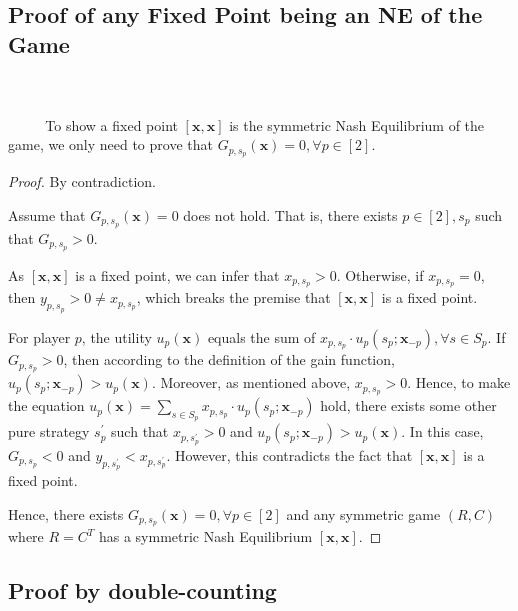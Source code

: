 \documentclass[oneside,solution]{seu-ml-assign}
\begin{document}
\subsection{Proof of any Fixed Point being an NE of the
Game}
\\ \hspace*{\fill} \\
$\text{        }\quad\text{  }$
To show a fixed point \([\mathbf{x},\mathbf{x}]\) is the symmetric Nash
Equilibrium of the game, we only need to prove that
\(G_{p,s_p}(\mathbf{x})=0,\forall p\in[2]\).
\begin{proof}

By contradiction.

Assume that \(G_{p,s_p}(\mathbf{x})=0\) does not hold. That is, there
exists \(p\in[2],s_p\) such that \(G_{p,s_p}>0\).

As \([\mathbf{x},\mathbf{x}]\) is a fixed point, we can infer that
\(x_{p,s_p}>0\). Otherwise, if \(x_{p,s_p}=0\), then
\(y_{p,s_p}>0 \neq x_{p,s_p}\), which breaks the premise that
\([\mathbf{x},\mathbf{x}]\) is a fixed point.

For player \(p\), the utility \(u_p(\mathbf{x})\) equals the sum of
\(x_{p,s_p}\cdot u_p(s_p;\mathbf{x}_{-p}),\forall s\in S_p\). If
\(G_{p,s_p}>0\), then according to the definition of the gain function,
\(u_p(s_p;\mathbf{x}_{-p})>u_p(\mathbf{x})\). Moreover, as mentioned
above, \(x_{p,s_p}>0\). Hence, to make the equation
\(u_p(\mathbf{x})=\sum_{s\in S_p}x_{p,s_p}\cdot u_p(s_p;\mathbf{x}_{-p})\) hold,
there exists some other pure strategy \(s_p^{'}\) such that
\(x_{p,s_p^{'}}>0\) and \(u_p(s_p;\mathbf{x}_{-p})>u_p(\mathbf{x})\). In
this case, \(G_{p,s_p}<0\) and \(y_{p,s_p^{'}}<x_{p,s_p^{'}}\). However,
this contradicts the fact that \([\mathbf{x},\mathbf{x}]\) is a fixed
point.

Hence, there exists \(G_{p,s_p}(\mathbf{x})=0,\forall p\in[2]\) and any
symmetric game \((R,C)\) where \(R=C^T\) has a symmetric Nash
Equilibrium \([\mathbf{x},\mathbf{x}]\).
\end{proof}
\subsection{Proof by double-counting}
\end{document}
